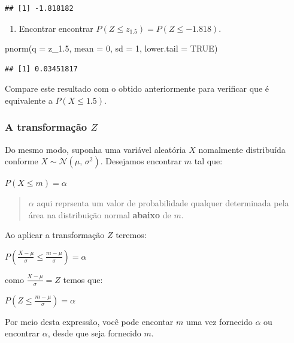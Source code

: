 \documentclass[
]{book}
\newenvironment{Shaded}{\begin{snugshade}}{\end{snugshade}}
\newcommand{\AttributeTok}[1]{\textcolor[rgb]{0.77,0.63,0.00}{#1}}
\newcommand{\ConstantTok}[1]{\textcolor[rgb]{0.00,0.00,0.00}{#1}}
\newcommand{\DecValTok}[1]{\textcolor[rgb]{0.00,0.00,0.81}{#1}}
\newcommand{\FloatTok}[1]{\textcolor[rgb]{0.00,0.00,0.81}{#1}}
\newcommand{\FunctionTok}[1]{\textcolor[rgb]{0.00,0.00,0.00}{#1}}
\newcommand{\NormalTok}[1]{#1}
\providecommand{\tightlist}{%
  \setlength{\itemsep}{0pt}\setlength{\parskip}{0pt}}
\begin{document}
\begin{verbatim}
## [1] -1.818182
\end{verbatim}

\begin{enumerate}
\def\labelenumi{\arabic{enumi}.}
\setcounter{enumi}{1}
\tightlist
\item
  Encontrar encontrar \(P(Z \le z_{1.5}) = P(Z \le -1.818)\).
\end{enumerate}

\begin{Shaded}
\begin{Highlighting}[]
\FunctionTok{pnorm}\NormalTok{(}\AttributeTok{q =}\NormalTok{ z\_1}\FloatTok{.5}\NormalTok{, }\AttributeTok{mean =} \DecValTok{0}\NormalTok{, }\AttributeTok{sd =} \DecValTok{1}\NormalTok{, }\AttributeTok{lower.tail =} \ConstantTok{TRUE}\NormalTok{)}
\end{Highlighting}
\end{Shaded}

\begin{verbatim}
## [1] 0.03451817
\end{verbatim}

Compare este resultado com o obtido anteriormente para verificar que é equivalente a \(P(X \le 1.5)\).

\hypertarget{a-transformauxe7uxe3o-z}{%
\subsubsection{\texorpdfstring{A transformação \(Z\)}{A transformação Z}}\label{a-transformauxe7uxe3o-z}}

Do mesmo modo, suponha uma variável aleatória \(X\) nomalmente distribuída conforme \(X \sim \mathcal{N}(\mu,\,\sigma^2)\). Desejamos encontrar \(m\) tal que:

\(P(X \le m) = \alpha\)

\begin{quote}
\(\alpha\) aqui reprsenta um valor de probabilidade qualquer determinada pela área na distribuição normal \textbf{abaixo} de \(m\).
\end{quote}

Ao aplicar a transformação \(Z\) teremos:

\(P(\frac{X - \mu}{\sigma} \le \frac{m - \mu}{\sigma}) = \alpha\)

como \(\frac{X - \mu}{\sigma} = Z\) temos que:

\(P(Z \le \frac{m - \mu}{\sigma}) = \alpha\)

Por meio desta expressão, você pode encontar \(m\) uma vez fornecido \(\alpha\) ou encontrar \(\alpha\), desde que seja fornecido \(m\).
\end{document}
